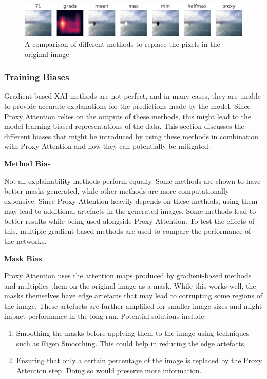 \begin{figure}[h]
    \centering
    \includegraphics[width=1\textwidth]{images/methods-crop.pdf}
    \caption{A comparison of different methods to replace the pixels in the original image}
    \label{fig:methods}
\end{figure}

\subsubsection{Training Biases}
Gradient-based XAI methods are not perfect, and in many cases, they are unable to provide accurate explanations for the predictions made by the model. Since Proxy Attention relies on the outputs of these methods, this might lead to the model learning biased representations of the data. This section discusses the different biases that might be introduced by using these methods in combination with Proxy Attention and how they can potentially be mitigated.

\textbf{Method Bias}

Not all explainability methods perform equally. Some methods are shown to have better masks generated, while other methods are more computationally expensive. Since Proxy Attention heavily depends on these methods, using them may lead to additional artefacts in the generated images. Some methods lead to better results while being used alongside Proxy Attention. To test the effects of this, multiple gradient-based methods are used to compare the performance of the networks.

\textbf{Mask Bias}

Proxy Attention uses the attention maps produced by gradient-based methods and multiplies them on the original image as a mask. While this works well, the masks themselves have edge artefacts that may lead to corrupting some regions of the image. These artefacts are further amplified for smaller image sizes and might impact performance in the long run.
Potential solutions include:

\begin{enumerate}
    \item Smoothing the masks before applying them to the image using techniques such as Eigen Smoothing. This could help in reducing the edge artefacts.
    \item Ensuring that only a certain percentage of the image is replaced by the Proxy Attention step. Doing so would preserve more information.
\end{enumerate}

